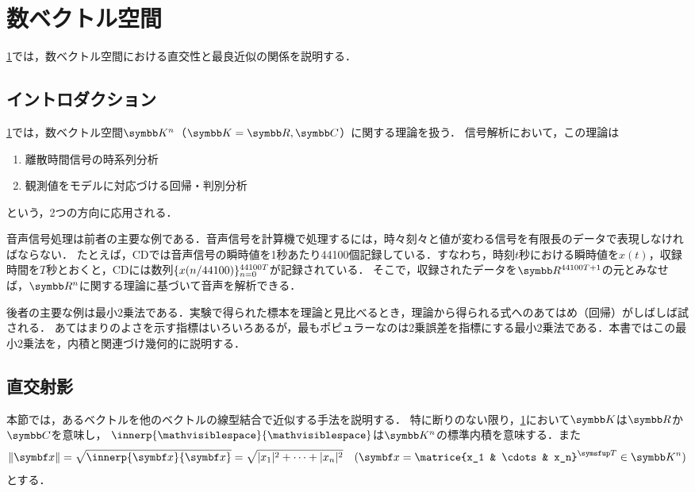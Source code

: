\documentclass[../../main]{subfiles}
\begin{document}
\chapter{数ベクトル空間}
\label{chapter:numerical_vector_space}

\begin{lead}
  \cref{chapter:numerical_vector_space}では，数ベクトル空間における直交性と最良近似の関係を説明する．
\end{lead}

\section{イントロダクション}
\label{section:numerical_vector_space_introduction}

\cref{chapter:numerical_vector_space}では，数ベクトル空間\(\numset{K}^n\)（\(\numset{K}=\numset{R},\numset{C}\)）に関する理論を扱う．
信号解析において，この理論は
\begin{enumerate}
  \item 離散時間信号の時系列分析
  \item 観測値をモデルに対応づける回帰・判別分析
\end{enumerate}
という，2つの方向に応用される．

音声信号処理は前者の主要な例である．音声信号を計算機で処理するには，時々刻々と値が変わる信号を有限長のデータで表現しなければならない．
たとえば，CDでは音声信号の瞬時値を1秒あたり44100個記録している．すなわち，時刻\(t\)秒における瞬時値を\(x(t)\)，収録時間を\(T\)秒とおくと，CDには数列\(\lbrace x(n/44100)\rbrace_{n=0}^{44100T}\)が記録されている．
そこで，収録されたデータを\(\numset{R}^{44100T+1}\)の元とみなせば，\(\numset{R}^n\)に関する理論に基づいて音声を解析できる．

後者の主要な例は最小2乗法である．実験で得られた標本を理論と見比べるとき，理論から得られる式へのあてはめ（回帰）がしばしば試される．
あてはまりのよさを示す指標はいろいろあるが，最もポピュラーなのは2乗誤差を指標にする最小2乗法である．本書ではこの最小2乗法を，内積と関連づけ幾何的に説明する．

\section{直交射影}

本節では，あるベクトルを他のベクトルの線型結合で近似する手法を説明する．
特に断りのない限り，\cref{chapter:numerical_vector_space}において\(\numset{K}\)は\(\numset{R}\)か\(\numset{C}\)を意味し，
\(\innerp{\holder}{\holder}\)は\(\numset{K}^n\)の標準内積を意味する．また
\[
  \vnorm{\vect{x}} = \sqrt{\innerp{\vect{x}}{\vect{x}}}
  = \sqrt{\abs{x_1}^2+\dots+\abs{x_n}^2}
  \quad(\vect{x}=\trps{\matrice{x_1 & \cdots & x_n}}\in\numset{K}^n)
\]
とする\indexsymbol{\(\vnorm{\holder}\)}．
\end{document}
